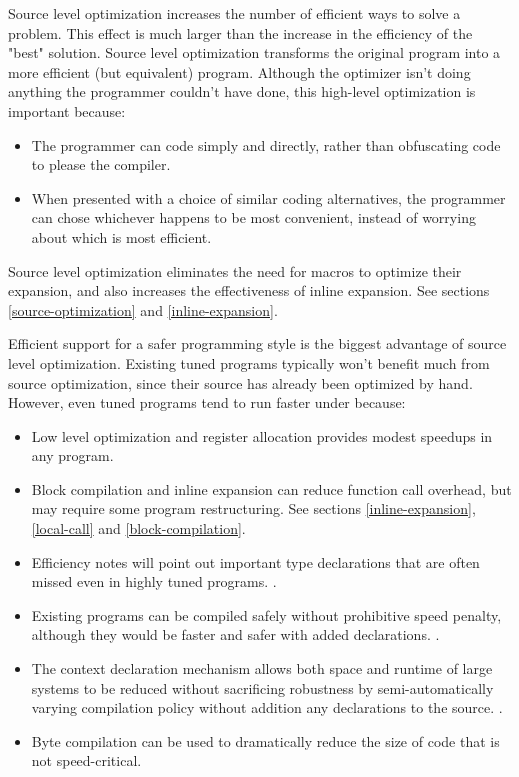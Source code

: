 Source level optimization increases the number of efficient ways to solve a
problem.  This effect is much larger than the increase in the efficiency of the
"best" solution.  Source level optimization transforms the original program
into a more efficient (but equivalent) program.  Although the optimizer isn't
doing anything the programmer couldn't have done, this high-level optimization
is important because:
\begin{itemize}

\item
The programmer can code simply and directly, rather than obfuscating code to
please the compiler.

\item
When presented with a choice of similar coding alternatives, the programmer can
chose whichever happens to be most convenient, instead of worrying about which
is most efficient.
\end{itemize}

Source level optimization eliminates the need for macros to optimize their
expansion, and also increases the effectiveness of inline expansion.
See sections \ref{source-optimization} and \ref{inline-expansion}.

Efficient support for a safer programming style is the biggest advantage of
source level optimization.  Existing tuned programs typically won't benefit
much from source optimization, since their source has already been optimized by
hand.  However, even tuned programs tend to run faster under \python{} because:
\begin{itemize}

\item
Low level optimization and register allocation provides modest speedups in any
program.

\item
Block compilation and inline expansion can reduce function call overhead,
but may require some program restructuring.  See sections
\ref{inline-expansion}, \ref{local-call} and \ref{block-compilation}.

\item
Efficiency notes will point out important type declarations that are often
missed even in highly tuned programs.  .

\item
Existing programs can be compiled safely without prohibitive speed penalty,
although they would be faster and safer with added declarations.
.

\item
The context declaration mechanism allows both space and runtime of large
systems to be reduced without sacrificing robustness by semi-automatically
varying compilation policy without addition any  declarations to
the source. .

\item 
Byte compilation can be used to dramatically reduce the size of code that
is not speed-critical. 
\end{itemize}


